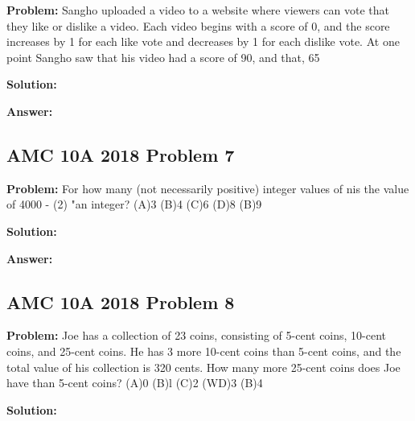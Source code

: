 \documentclass{article}
\newenvironment{problem}{\textbf{Problem: }}{\\}
\newenvironment{solution}{\textbf{Solution: }}{\\}
\newenvironment{answer}{\textbf{Answer: }}{\\}
\begin{document}
\begin{problem}
Sangho uploaded a video to a website where viewers can vote that they like or dislike a video. Each video begins with a score of 0, and the score increases by 1 for each like vote and decreases by 1 for each dislike vote. At one point Sangho saw that his video had a score of 90, and that, 65%
\end{problem}

\begin{solution}
\end{solution}

\begin{answer}
\end{answer}

\subsection{AMC 10A 2018 Problem 7}

\begin{problem}
For how many (not necessarily positive) integer values of nis the value of 4000 - (2) "an integer? (A)3 (B)4 (C)6 (D)8 (B)9
\end{problem}

\begin{solution}
\end{solution}

\begin{answer}
\end{answer}

\subsection{AMC 10A 2018 Problem 8}

\begin{problem}
Joe has a collection of 23 coins, consisting of 5-cent coins, 10-cent coins, and 25-cent coins. He has 3 more 10-cent coins than 5-cent coins, and the total value of his collection is 320 cents. How many more 25-cent coins does Joe have than 5-cent coins? (A)0 (B)l (C)2 (WD)3 (B)4
\end{problem}

\begin{solution}
\end{solution}
\end{document}
